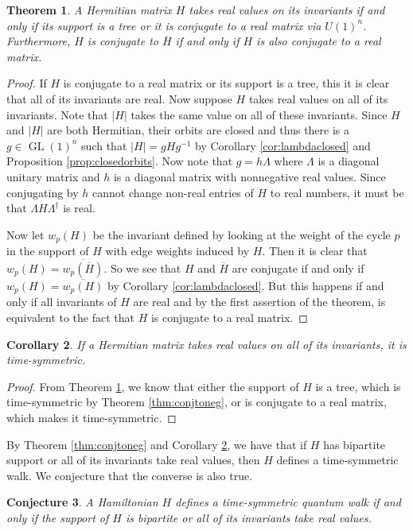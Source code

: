 \documentclass[twocolumn,superscriptaddress]{revtex4-1}
\newcommand{\GL}{\operatorname{GL}}
\theoremstyle{plain}
\newtheorem{theorem}{Theorem}[section]
\newtheorem{corollary}[theorem]{Corollary}
\newtheorem{conjecture}[theorem]{Conjecture}
\theoremstyle{definition}
\theoremstyle{definition}
\theoremstyle{definition}
\theoremstyle{definition}
\theoremstyle{definition}
\theoremstyle{definition}
\begin{document}
\begin{theorem}\label{thm:realinvs}
 A Hermitian matrix $H$ takes real values on its invariants if and only if its support is a tree or it is conjugate to a real matrix via $U(1)^n$. Furthermore, $H$ is conjugate to $\overline{H}$ if and only if $H$ is also conjugate to a real matrix.
\end{theorem}
\begin{proof}
 If $H$ is conjugate to a real matrix or its support is a tree, this it is clear that all of its invariants are real. Now suppose $H$ takes real values on all of its invariants. Note that $|H|$ takes the same value on all of these invariants. Since $H$ and $|H|$ are both Hermitian, their orbits are closed and thus there is a $g\in \GL(1)^n$ such that $|H|=gHg^{-1}$ by Corollary \ref{cor:lambdaclosed} and Proposition \ref{prop:closedorbits}. Now note that $g=h\Lambda$ where $\Lambda$ is a diagonal unitary matrix and $h$ is a diagonal matrix with nonnegative real values. Since conjugating by $h$ cannot change non-real entries of $H$ to real numbers, it must be that $\Lambda H\Lambda^\dagger$ is real.
 
Now let $w_p(H)$ be the invariant defined by looking at the weight of the cycle $p$ in the support of $H$ with edge weights induced by $H$. Then it is clear that $w_p(H)=\overline{w_p(\overline{H})}$. So we see that $H$ and $\overline{H}$ are conjugate if and only if $w_p(H)=\overline{w_p(H)}$ by Corollary \ref{cor:lambdaclosed}. But this happens if and only if all invariants of $H$ are real and by the first assertion of the theorem, is equivalent to the fact that $H$ is conjugate to a real matrix.
\end{proof}
\begin{corollary}\label{cor:realinvs}
 If a Hermitian matrix takes real values on all of its invariants, it is time-symmetric.
\end{corollary}
\begin{proof}
 From Theorem \ref{thm:realinvs}, we know that either the support of $H$ is a tree, which is time-symmetric by Theorem \ref{thm:conjtoneg}, or is conjugate to a real matrix, which makes it time-symmetric.
\end{proof}

By Theorem \ref{thm:conjtoneg} and Corollary \ref{cor:realinvs}, we have that if $H$ has bipartite support or all of its invariants take real values, then $H$ defines a time-symmetric walk. We conjecture that the converse is also true.

\begin{conjecture}
 A Hamiltonian $H$ defines a time-symmetric quantum walk if and only if the support of $H$ is bipartite or all of its invariants take real values.
\end{conjecture}
\end{document}
